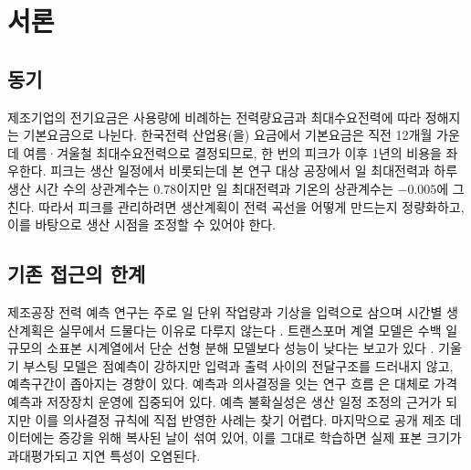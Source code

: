 \begin{abstract}
제조공장의 전력 수요는 설비 가동 일정에 따라 크게 달라지며, 최대수요전력은 12개월 래칫 규정을 통해 이후 1년간의 기본요금을 결정한다. 본 연구는 베이지안 어텐션 전달모형(Bayesian Attention Transfer, BAT)을 제안한다. BAT는 시간별 생산계획에서 하루 96개 15분 슬롯의 전력 곡선을 예측하고 예측 모델의 사후분포를 생산 재배치 의사결정에 연결한다. 모형은 가동유형별 기본곡선과 희소 국소 어텐션으로 구성되며 이 어텐션에서 전력 슬롯은 인접 생산 시각을 참조한다. 어텐션의 폭·모양·지연과 생산 이득은 Gibbs 표집과 Metropolis 갱신으로 추정한다. 실제 관측일이 65일에 불과한 KAMP 자원 최적화 데이터셋에서 BAT는 7–8월 검증 구간 56일 동안 생산계획을 입력받는 LightGBM보다 MAE를 33\% 줄였고(7.82 대 11.64 kW), CRPS와 일 피크 오차도 개선하였다. 9월 봉인 시험 구간에서는 두 모델이 대등하였다. 추정된 전달구조에 따르면 전력은 생산계획보다 0–2시간 앞서 상승한다. 이 구조에 한국전력 산업용 요금과 인건비 할증을 반영하여 생산 재배치 권고를 산출한다.
\end{abstract}

\section{서론}

\subsection{동기}
제조기업의 전기요금은 사용량에 비례하는 전력량요금과 최대수요전력에 따라 정해지는 기본요금으로 나뉜다. 한국전력 산업용(을) 요금에서 기본요금은 직전 12개월 가운데 여름·겨울철 최대수요전력으로 결정되므로, 한 번의 피크가 이후 1년의 비용을 좌우한다. 피크는 생산 일정에서 비롯되는데 본 연구 대상 공장에서 일 최대전력과 하루 생산 시간 수의 상관계수는 0.78이지만 일 최대전력과 기온의 상관계수는 $-0.005$에 그친다. 따라서 피크를 관리하려면 생산계획이 전력 곡선을 어떻게 만드는지 정량화하고, 이를 바탕으로 생산 시점을 조정할 수 있어야 한다.

\subsection{기존 접근의 한계}
제조공장 전력 예측 연구는 주로 일 단위 작업량과 기상을 입력으로 삼으며 시간별 생산계획은 실무에서 드물다는 이유로 다루지 않는다 \citep{kim2023c2transformer}. 트랜스포머 계열 모델은 수백 일 규모의 소표본 시계열에서 단순 선형 분해 모델보다 성능이 낮다는 보고가 있다 \citep{zeng2023dlinear}. 기울기 부스팅 모델은 점예측이 강하지만 입력과 출력 사이의 전달구조를 드러내지 않고, 예측구간이 좁아지는 경향이 있다. 예측과 의사결정을 잇는 연구 흐름 \citep{mandi2024dfl}은 대체로 가격 예측과 저장장치 운영에 집중되어 있다. 예측 불확실성은 생산 일정 조정의 근거가 되지만 이를 의사결정 규칙에 직접 반영한 사례는 찾기 어렵다. 마지막으로 공개 제조 데이터에는 증강을 위해 복사된 날이 섞여 있어, 이를 그대로 학습하면 실제 표본 크기가 과대평가되고 지연 특성이 오염된다.


